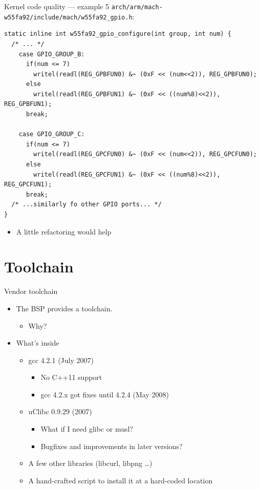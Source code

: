 \documentclass[xetex,table]{beamer}
\begin{document}
\begin{frame}[fragile]{Kernel code quality --- example 5}
  \texttt{arch/arm/mach-w55fa92/include/mach/w55fa92\_gpio.h}:

  \linespread{1}
  \begin{verbatim}
static inline int w55fa92_gpio_configure(int group, int num) {
  /* ... */
    case GPIO_GROUP_B:
      if(num <= 7)
        writel(readl(REG_GPBFUN0) &~ (0xF << (num<<2)), REG_GPBFUN0);
      else
        writel(readl(REG_GPBFUN1) &~ (0xF << ((num%8)<<2)), REG_GPBFUN1);
      break;

    case GPIO_GROUP_C:
      if(num <= 7)
        writel(readl(REG_GPCFUN0) &~ (0xF << (num<<2)), REG_GPCFUN0);
      else
        writel(readl(REG_GPCFUN1) &~ (0xF << ((num%8)<<2)), REG_GPCFUN1);
      break;
  /* ...similarly fo other GPIO ports... */
}
  \end{verbatim}

  \begin{itemize}
  \item A little refactoring would help
  \end{itemize}
\end{frame}

\section{Toolchain}

\begin{frame}{Vendor toolchain}
  \begin{itemize}
  \item The BSP provides a toolchain.
    \begin{itemize}
    \item Why?
    \end{itemize}
  \item What's inside
    \begin{itemize}
    \item gcc 4.2.1 (July 2007)
      \begin{itemize}
      \item No C++11 support
      \item gcc 4.2.x got fixes until 4.2.4 (May 2008)
      \end{itemize}
    \item uClibc 0.9.29 (2007)
      \begin{itemize}
      \item What if I need glibc or musl?
      \item Bugfixes and improvements in later versions?
      \end{itemize}
    \item A few other libraries (libcurl, libpng \dots)
    \item A hand-crafted script to install it at a hard-coded location
    \end{itemize}
  \end{itemize}
\end{frame}
\end{document}
